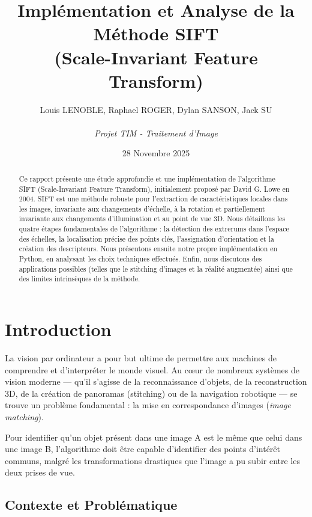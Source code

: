 \documentclass[a4paper,12pt]{report}
\title{\textbf{Implémentation et Analyse de la Méthode SIFT}\\ (Scale-Invariant Feature Transform)}
\author{Louis LENOBLE, Raphael ROGER, Dylan SANSON, Jack SU \\ \\ \textit{Projet TIM - Traitement d'Image}}
\date{28 Novembre 2025}
\begin{document}
\maketitle

\begin{abstract}
Ce rapport présente une étude approfondie et une implémentation de l'algorithme SIFT (Scale-Invariant Feature Transform), initialement proposé par David G. Lowe en 2004. SIFT est une méthode robuste pour l'extraction de caractéristiques locales dans les images, invariante aux changements d'échelle, à la rotation et partiellement invariante aux changements d'illumination et au point de vue 3D. Nous détaillons les quatre étapes fondamentales de l'algorithme : la détection des extrerums dans l'espace des échelles, la localisation précise des points clés, l'assignation d'orientation et la création des descripteurs. Nous présentons ensuite notre propre implémentation en Python, en analysant les choix techniques effectués. Enfin, nous discutons des applications possibles (telles que le stitching d'images et la réalité augmentée) ainsi que des limites intrinsèques de la méthode.
\end{abstract}

\tableofcontents

\chapter{Introduction}

La vision par ordinateur a pour but ultime de permettre aux machines de comprendre et d'interpréter le monde visuel. Au cœur de nombreux systèmes de vision moderne — qu'il s'agisse de la reconnaissance d'objets, de la reconstruction 3D, de la création de panoramas (stitching) ou de la navigation robotique — se trouve un problème fondamental : la mise en correspondance d'images (\textit{image matching}).

Pour identifier qu'un objet présent dans une image A est le même que celui dans une image B, l'algorithme doit être capable d'identifier des points d'intérêt communs, malgré les transformations drastiques que l'image a pu subir entre les deux prises de vue.

\section{Contexte et Problématique}
\end{document}
